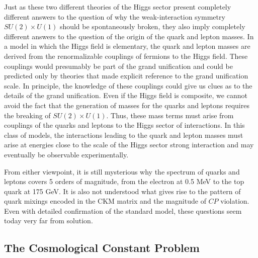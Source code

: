 Just as these two different theories of the Higgs sector present completely
different answers to the question of why the weak-interaction symmetry
$SU(2)\times U(1)$ should be spontaneously broken, they also imply completely
different answers to the question of the origin of the quark and lepton
masses.  In a model in which the Higgs field is elementary, the quark and
lepton masses are derived from the renormalizable couplings of fermions to
the Higgs field.  These couplings would presumably be part of the grand
unification and could be predicted only by theories that made explicit
reference to the grand unification scale.  In principle, the knowledge of
these couplings could give us clues as to the details of the grand
unification.  Even if the Higgs field is composite, we cannot avoid the fact
that the generation of masses for the quarks and leptons requires the
breaking of $SU(2)\times U(1)$.  Thus, these mass terms must arise from
couplings of the quarks and leptons to the Higgs sector of interactions.  In
this class of models, the interactions leading to the quark and lepton masses
must arise at energies close to the scale of the Higgs sector strong
interaction and may eventually be observable experimentally.

From either viewpoint, it is still mysterious why the spectrum of quarks and
leptons covers 5 orders of magnitude, from the electron at 0.5 MeV to the
top quark at 175 GeV.  It is also not understood what gives rise to the
pattern of quark mixings encoded in the CKM matrix and the magnitude of
$CP$ violation.  Even with detailed confirmation of the standard model,
these questions seem today very far from solution.

\subsection{The Cosmological Constant Problem}

